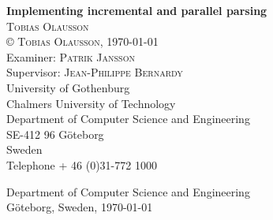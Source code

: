 \begin{titlepage}
\noindent \textbf{Implementing incremental and parallel parsing}\\
\noindent \textsc{Tobias Olausson} \\

\noindent \copyright \textsc{ Tobias Olausson}, \monthdate\today \\

\noindent Examiner: \textsc{Patrik Jansson} \\
\noindent Supervisor: \textsc{Jean-Philippe Bernardy}\\

\noindent University of Gothenburg \\
Chalmers University of Technology \\
Department of Computer Science and Engineering \\
SE-412 96 Göteborg \\
Sweden \\
Telephone + 46 (0)31-772 1000 \\

\vfill

\noindent Department of Computer Science and Engineering \\
Göteborg, Sweden, \monthdate\today
\end{titlepage}
